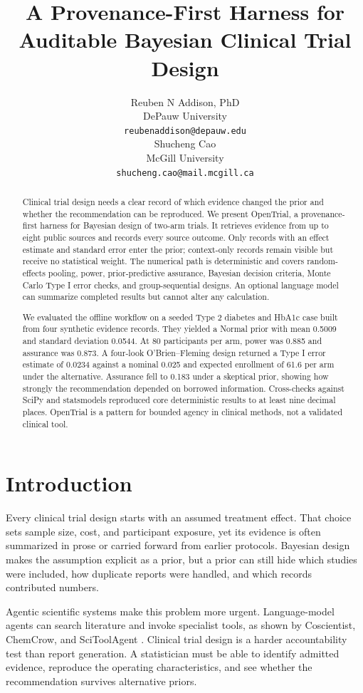 \documentclass{article}
\title{A Provenance-First Harness for Auditable Bayesian Clinical Trial Design}
\author{%
  Reuben N Addison, PhD \\
  DePauw University \\
  \texttt{reubenaddison@depauw.edu} \\
  \And
  Shucheng Cao \\
  McGill University \\
  \texttt{shucheng.cao@mail.mcgill.ca} \\
}
\begin{document}
\maketitle

\begin{abstract}
Clinical trial design needs a clear record of which evidence changed the prior and whether the recommendation can be reproduced. We present OpenTrial, a provenance-first harness for Bayesian design of two-arm trials. It retrieves evidence from up to eight public sources and records every source outcome. Only records with an effect estimate and standard error enter the prior; context-only records remain visible but receive no statistical weight. The numerical path is deterministic and covers random-effects pooling, power, prior-predictive assurance, Bayesian decision criteria, Monte Carlo Type I error checks, and group-sequential designs. An optional language model can summarize completed results but cannot alter any calculation.

We evaluated the offline workflow on a seeded Type 2 diabetes and HbA1c case built from four synthetic evidence records. They yielded a Normal prior with mean 0.5009 and standard deviation 0.0544. At 80 participants per arm, power was 0.885 and assurance was 0.873. A four-look O'Brien--Fleming design returned a Type I error estimate of 0.0234 against a nominal 0.025 and expected enrollment of 61.6 per arm under the alternative. Assurance fell to 0.183 under a skeptical prior, showing how strongly the recommendation depended on borrowed information. Cross-checks against SciPy and statsmodels reproduced core deterministic results to at least nine decimal places. OpenTrial is a pattern for bounded agency in clinical methods, not a validated clinical tool.
\end{abstract}

\section{Introduction}

Every clinical trial design starts with an assumed treatment effect. That choice sets sample size, cost, and participant exposure, yet its evidence is often summarized in prose or carried forward from earlier protocols. Bayesian design makes the assumption explicit as a prior, but a prior can still hide which studies were included, how duplicate reports were handled, and which records contributed numbers.

Agentic scientific systems make this problem more urgent. Language-model agents can search literature and invoke specialist tools, as shown by Coscientist, ChemCrow, and SciToolAgent \citep{boiko2023,bran2024,ding2025}. Clinical trial design is a harder accountability test than report generation. A statistician must be able to identify admitted evidence, reproduce the operating characteristics, and see whether the recommendation survives alternative priors.
\end{document}
